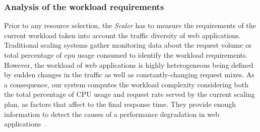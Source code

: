 



\subsubsection{Analysis of the workload requirements\label{workloadReq}}

Prior to any resource selection, the \emph{Scaler} has to measure the requirements of the current workload taken into account the traffic diversity of web applications. Traditional scaling systems gather monitoring data about the request volume or total percentage of cpu usage consumed to identify the workload requirements. However, the workload of web applications is highly heterogeneous being defined by sudden changes in the traffic as well as constantly-changing request mixes. As a consequence, our system computes the workload complexity considering both the total percentage of CPU usage and request rate served by the current scaling plan,  as factors that affect to the final response time. They provide enough information to detect the causes of a performance degradation in web applications~\cite{smartscale_2012}. 

